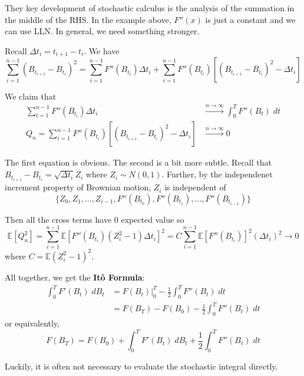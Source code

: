 \documentclass[12pt]{report}
\newcommand{\E}{\mathbb{E}}
\newcommand*{\tbf}[1]{\ifmmode\mathbf{#1}\else\textbf{#1}\fi}
\begin{document}
    They key development of stochastic calculus is the analysis of the summation in the middle of the RHS. In the example above, $F''(x)$ is just a constant and we can use LLN. In general, we need something stronger. 

    Recall $\Delta t_i = t_{i+1} - t_i$. We have 
    \[\sum_{i=1}^{n-1} (B_{t_{i+1}} - B_{t_i})^2 = \sum_{i=1}^{n-1} F''(B_{t_i}) \Delta t_i + \sum_{i=1}^{n-1} F''(B_{t_i}) \left[(B_{t_{i+1}} - B_{t_i})^2 - \Delta t_i\right]\]

    We claim that 
    \begin{align*}
        \sum_{i=1}^{n-1} F''(B_{t_i}) \Delta t_i &\overset{n \to \infty}{\longrightarrow} \int_0^T F''(B_t) \; dt\\ 
        Q_n = \sum_{i=1}^{n-1} F''(B_{t_i}) \left[(B_{t_{i+1}} - B_{t_i})^2 - \Delta t_i\right] &\overset{n \to \infty}{\longrightarrow} 0
    \end{align*}

    The first equation is obvious. The second is a bit more subtle. Recall that $B_{t_{i+1}} - B_{t_i} = \sqrt{\Delta t_i} Z_i$ where $Z_i \sim N(0, 1)$. Further, by the independenet increment property of Brownian motion, $Z_i$ is independent of 
    \[\{Z_0, Z_1, \dots, Z_{i-1}, F''(B_{t_0}), F''(B_{t_1}), \dots, F''(B_{t_{i-1}})\}\]

    Then all the cross terms have $0$ expected value so 
    \[\E[Q_n^2] = \sum_{i=1}^{n-1} \E[F''(B_{t_i}) (Z_i^2 - 1)\Delta t_i]^2 = C \sum_{i=1}^{n-1} \E[F''(B_{t_i})]^2 (\Delta t_i)^2 \to 0\]
    where $C = \E(Z_i^2 - 1)^2$. 

    All together, we get the \tbf{Itô Formula}:
    \begin{align*}
        \int_0^T F'(B_t) \; dB_t &= F(B_t)\bigg\vert_0^T - \frac{1}{2}\int_0^T F''(B_t) \; dt\\
        &= F(B_T) - F(B_0) - \frac{1}{2}\int_0^T F''(B_t) \; dt
    \end{align*}
    or equivalently, 
    \[F(B_T) = F(B_0) + \int_0^T F'(B_t) \; dB_t + \frac{1}{2}\int_0^T F''(B_t)\; dt\]

    Luckily, it is often not necessary to evaluate the stochastic integral directly.
\end{document}
